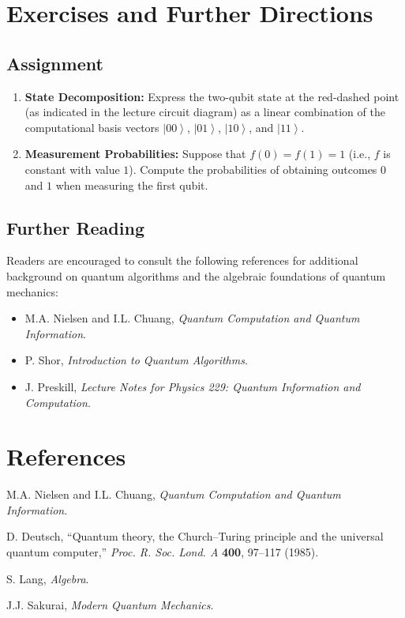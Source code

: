 \documentclass[11pt,oneside]{book}
\theoremstyle{remark}
\renewcommand{\ket}[1]{\left|#1\right\rangle}
\begin{document}
	\chapter{Exercises and Further Directions}
	
	\section*{Assignment}
	\begin{enumerate}[label=\textbf{Problem \arabic*:}]
		\item \textbf{State Decomposition:}  
		Express the two-qubit state at the red-dashed point (as indicated in the lecture circuit diagram) as a linear combination of the computational basis vectors $\ket{00}$, $\ket{01}$, $\ket{10}$, and $\ket{11}$.
		\item \textbf{Measurement Probabilities:}  
		Suppose that $f(0)=f(1)=1$ (i.e., $f$ is constant with value $1$). Compute the probabilities of obtaining outcomes $0$ and $1$ when measuring the first qubit.
	\end{enumerate}
	
	\section*{Further Reading}
	Readers are encouraged to consult the following references for additional background on quantum algorithms and the algebraic foundations of quantum mechanics:
	\begin{itemize}
		\item M.A. Nielsen and I.L. Chuang, \emph{Quantum Computation and Quantum Information}.
		\item P. Shor, \emph{Introduction to Quantum Algorithms}.
		\item J. Preskill, \emph{Lecture Notes for Physics 229: Quantum Information and Computation}.
	\end{itemize}
	
	\backmatter
	\chapter{References}
	\begin{enumerate}[label={[\arabic*]}]
		\item M.A. Nielsen and I.L. Chuang, \emph{Quantum Computation and Quantum Information}.
		\item D. Deutsch, ``Quantum theory, the Church--Turing principle and the universal quantum computer,'' \emph{Proc. R. Soc. Lond. A} \textbf{400}, 97--117 (1985).
		\item S. Lang, \emph{Algebra}.
		\item J.J. Sakurai, \emph{Modern Quantum Mechanics}.
	\end{enumerate}
	
\end{document}
